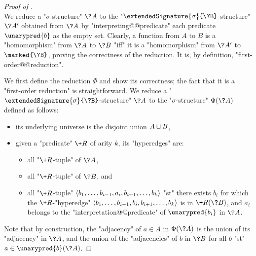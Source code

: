 \begin{proof}[Proof of ]
	\\
	We reduce a "$\sigma$-structure" $\?A$ to the
	"$\extendedSignature{\sigma}{\?B}$-structure" $\?A'$ obtained
	from $\?A$ by "interpreting@@predicate" each predicate $\unarypred{b}$ as the empty set.
	Clearly, a function from $A$ to $B$ is a "homomorphism" from $\?A$ to $\?B$
	"iff" it is a "homomorphism" from $\?A'$ to $\marked{\?B}$, proving the correctness
	of the reduction. It is, by definition, "first-order@@reduction".

	We first define the reduction $\Phi$ and show its correctness; the fact that it
	is a "first-order reduction" is straightforward.
	We reduce a "$\extendedSignature{\sigma}{\?B}$-structure" $\?A$ to the "$\sigma$-structure"
	$\Phi(\?A)$ defined as follows:
	\begin{itemize}
		\item its underlying universe is the disjoint union $A \sqcup B$,
		\item given a "predicate" $\+R$ of arity $k$, its "hyperedges" are:
		\begin{itemize}
		\item all "$\+R$-tuple" of $\?A$,
		\item all "$\+R$-tuple" of $\?B$, and
		\item all "$\+R$-tuple" $\langle b_1,\dotsc,b_{i-1}, a_i, b_{i+1},\dotsc,b_k\rangle$
			"st" there exists $b_i$ for which the $\+R$-"hyperedge"
			$\langle b_1,\dotsc,b_{i-1}, b_i, b_{i+1},\dotsc,b_k\rangle$
			is in $\+R(\?B)$, and $a_i$ belongs to the "interpretation@@predicate" of 
			$\unarypred{b_i}$ in $\?A$.
		\end{itemize}
	\end{itemize}
	Note that by construction, the "adjacency" of $a \in A$ in $\Phi(\?A)$ is
	the union of its "adjacency" in $\?A$, and the union of the "adjacencies" of
	$b$ in $\?B$ for all $b$ "st" $a \in \unarypred{b}(\?A)$.


\end{proof}
